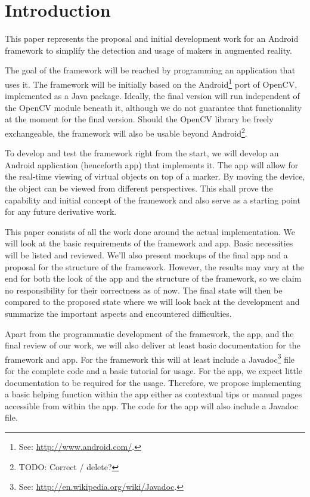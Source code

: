 \section{Introduction}

This paper represents the proposal and initial development work for an Android framework to simplify the detection and usage of makers in augmented reality.

The goal of the framework will be reached by programming an application that uses it.
The framework will be initially based on the Android\footnote{See: \url{http://www.android.com/}.} port\cite{opencvandroid} of OpenCV\cite{opencv}, implemented as a Java package.
Ideally, the final version will run independent of the OpenCV module beneath it, although we do not guarantee that functionality at the moment for the final version.
Should the OpenCV library be freely exchangeable, the framework will also be usable beyond Android\footnote{TODO: Correct / delete?}.

To develop and test the framework right from the start, we will develop an Android application (henceforth app) that implements it.
The app will allow for the real-time viewing of virtual objects on top of a marker.
By moving the device, the object can be viewed from different perspectives.
This shall prove the capability and initial concept of the framework and also serve as a starting point for any future derivative work.

This paper consists of all the work done around the actual implementation.
We will look at the basic requirements of the framework and app.
Basic necessities will be listed and reviewed.
We'll also present mockups of the final app and a proposal for the structure of the framework.
However, the results may vary at the end for both the look of the app and the structure of the framework, so we claim no responsibility for their correctness as of now.
The final state will then be compared to the proposed state where we will look back at the development and summarize the important aspects and encountered difficulties.

Apart from the programmatic development of the framework, the app, and the final review of our work, we will also deliver at least basic documentation for the framework and app.
For the framework this will at least include a Javadoc\footnote{See: \url{http://en.wikipedia.org/wiki/Javadoc}.} file for the complete code and a basic tutorial for usage.
For the app, we expect little documentation to be required for the usage.
Therefore, we propose implementing a basic helping function within the app either as contextual tips or manual pages accessible from within the app.
The code for the app will also include a Javadoc file.

